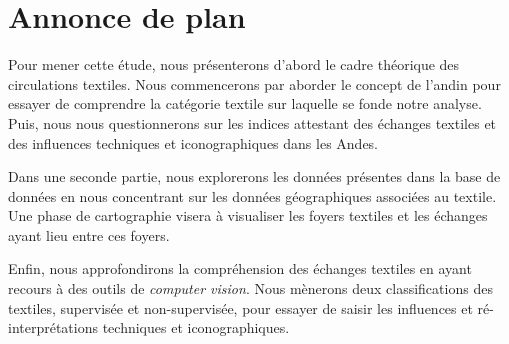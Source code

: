 \section*{Annonce de plan}
Pour mener cette étude, nous présenterons d'abord le cadre théorique des circulations textiles. Nous commencerons par aborder le concept de \og l'andin \fg \:pour essayer de comprendre la catégorie textile sur laquelle se fonde notre analyse. Puis, nous nous questionnerons sur les indices attestant des échanges textiles et des influences techniques et iconographiques dans les Andes. 

Dans une seconde partie, nous explorerons les données présentes dans la base de données en nous concentrant sur les données géographiques associées au textile. Une phase de cartographie visera à visualiser les foyers textiles et les échanges ayant lieu entre ces foyers.

Enfin, nous approfondirons la compréhension des échanges textiles en ayant recours à des outils de \textit{computer vision}. Nous mènerons deux classifications des textiles, supervisée et non-supervisée, pour essayer de saisir les influences et ré-interprétations techniques et iconographiques.

